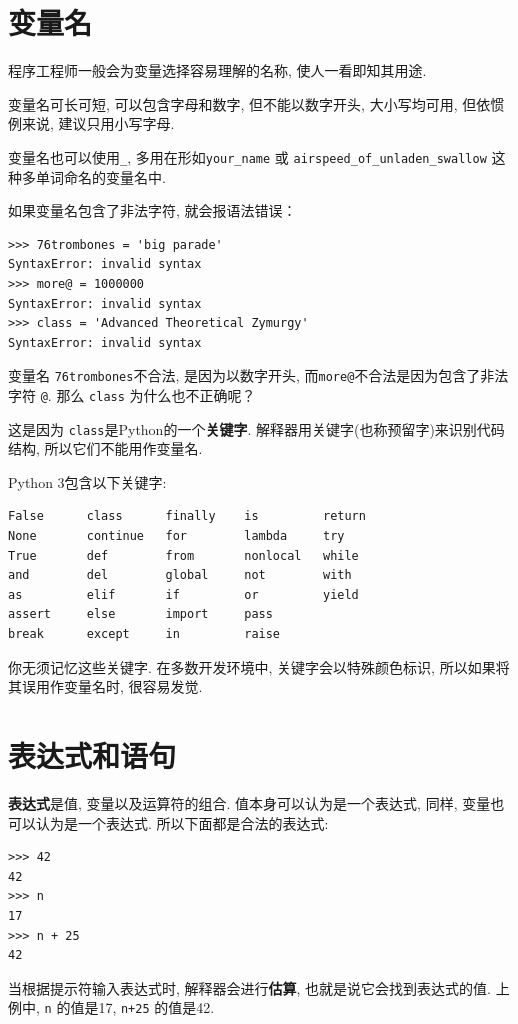 \documentclass[10pt]{book}
\begin{document}
\section{变量名}

程序工程师一般会为变量选择容易理解的名称, 使人一看即知其用途. 

变量名可长可短, 可以包含字母和数字, 但不能以数字开头, 
大小写均可用, 但依惯例来说, 建议只用小写字母. 

变量名也可以使用\verb"_",  多用在形如\verb"your_name" 或 
\verb"airspeed_of_unladen_swallow" 这种多单词命名的变量名中. 

如果变量名包含了非法字符, 就会报语法错误：

\begin{verbatim}
>>> 76trombones = 'big parade'
SyntaxError: invalid syntax
>>> more@ = 1000000
SyntaxError: invalid syntax
>>> class = 'Advanced Theoretical Zymurgy'
SyntaxError: invalid syntax
\end{verbatim}
%
变量名 {\tt 76trombones}不合法, 是因为以数字开头, 
而{\tt more@}不合法是因为包含了非法字符 {\tt @}. 
那么 {\tt class} 为什么也不正确呢？

这是因为 {\tt class}是Python的一个{\bf 关键字}. 
解释器用关键字(也称预留字)来识别代码结构, 所以它们不能用作变量名. 

Python 3包含以下关键字:

\begin{verbatim}
False      class      finally    is         return
None       continue   for        lambda     try
True       def        from       nonlocal   while
and        del        global     not        with
as         elif       if         or         yield
assert     else       import     pass
break      except     in         raise
\end{verbatim}
%

你无须记忆这些关键字. 在多数开发环境中, 关键字会以特殊颜色标识, 
所以如果将其误用作变量名时, 很容易发觉. 

\section{表达式和语句}

{\bf 表达式}是值, 变量以及运算符的组合. 
值本身可以认为是一个表达式, 同样, 变量也可以认为是一个表达式. 
所以下面都是合法的表达式:

\begin{verbatim}
>>> 42
42
>>> n
17
>>> n + 25
42
\end{verbatim}
%
当根据提示符输入表达式时, 解释器会进行{\bf 估算}, 也就是说它会找到表达式的值. 
上例中, {\tt n} 的值是17, {\tt n+25} 的值是42. 
\end{document}

